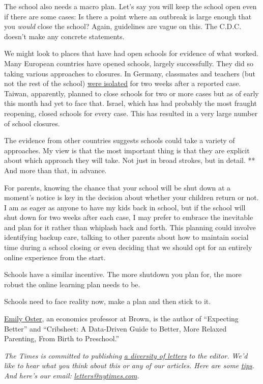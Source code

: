 The school also needs a macro plan. Let's say you will keep the school
open even if there are some cases: Is there a point where an outbreak is
large enough that you \emph{would} close the school? Again, guidelines
are vague on this. The C.D.C. doesn't make any concrete statements.

We might look to places that have had open schools for evidence of what
worked. Many European countries have opened schools, largely
successfully. They did so taking various approaches to closures. In
Germany, classmates and teachers (but not the rest of the school)
\href{https://www.sciencemag.org/news/2020/07/school-openings-across-globe-suggest-ways-keep-coronavirus-bay-despite-outbreaks}{were
isolated} for two weeks after a reported case. Taiwan, apparently,
planned to close schools for two or more cases but as of early this
month had yet to face that. Israel, which has had probably the most
fraught reopening, closed schools for every case. This has resulted in a
very large number of school closures.

The evidence from other countries suggests schools could take a variety
of approaches. My view is that the most important thing is that they are
explicit about which approach they will take. Not just in broad strokes,
but in detail. ** And more than that, in advance.

For parents, knowing the chance that your school will be shut down at a
moment's notice is key in the decision about whether your children
return or not. I am as eager as anyone to have my kids back in school,
but if the school will shut down for two weeks after each case, I may
prefer to embrace the inevitable and plan for it rather than whiplash
back and forth. This planning could involve identifying backup care,
talking to other parents about how to maintain social time during a
school closing or even deciding that we should opt for an entirely
online experience from the start.

Schools have a similar incentive. The more shutdown you plan for, the
more robust the online learning plan needs to be.

Schools need to face reality now, make a plan and then stick to it.

\href{https://www.brown.edu/research/projects/oster/}{Emily Oster}, an
economics professor at Brown, is the author of ``Expecting Better'' and
``Cribsheet: A Data-Driven Guide to Better, More Relaxed Parenting, From
Birth to Preschool.''

\emph{The Times is committed to publishing}
\href{https://www.nytimes.com/2019/01/31/opinion/letters/letters-to-editor-new-york-times-women.html}{\emph{a
diversity of letters}} \emph{to the editor. We'd like to hear what you
think about this or any of our articles. Here are some}
\href{https://help.nytimes.com/hc/en-us/articles/115014925288-How-to-submit-a-letter-to-the-editor}{\emph{tips}}\emph{.
And here's our email:}
\href{mailto:letters@nytimes.com}{\emph{letters@nytimes.com}}\emph{.}

